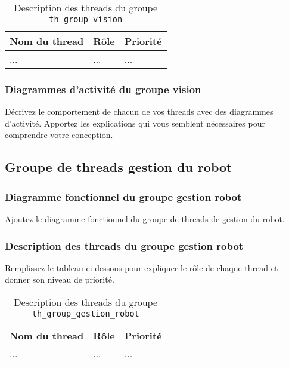 \documentclass[11pt, a4paper]{paper}
\begin{document}
\begin{table}[htp]
\caption{Description des threads du groupe {\tt th\_group\_vision}}
\begin{center}
\begin{tabular}{|p{3cm}|p{8.5cm}|p{2cm}|}
\hline
\bf Nom du thread &	\bf Rôle &	\bf Priorité \\
\hline
\hline
\color{blue}... &	\color{blue}... &	\color{blue}...\\
\hline
\end{tabular}
\end{center}
\label{tab:gt_vision}
\end{table}%
\FloatBarrier

\subsubsection{Diagrammes d'activité du groupe vision}
{\color{blue}Décrivez le comportement de chacun de vos threads avec des diagrammes d'activité. Apportez les explications qui vous semblent nécessaires pour comprendre votre conception.}


\subsection{Groupe de threads gestion du robot}

\subsubsection{Diagramme fonctionnel du groupe gestion robot}
{\color{blue} Ajoutez le diagramme fonctionnel du groupe de threads de gestion du robot.}

\subsubsection{Description des threads du groupe gestion robot}
{\color{red} Remplissez le tableau ci-dessous pour expliquer le rôle de chaque thread et donner son niveau de priorité.}


\begin{table}[htp]
\caption{Description des threads du groupe {\tt th\_group\_gestion\_robot}}
\begin{center}
\begin{tabular}{|p{3cm}|p{8.5cm}|p{2cm}|}
\hline
\bf Nom du thread &	\bf Rôle &	\bf Priorité \\
\hline
\hline
\color{blue}... &	\color{blue}... &	\color{blue}...\\
\hline
\end{tabular}
\end{center}
\label{tab:gt_robot}
\end{table}%
\FloatBarrier
\end{document}
